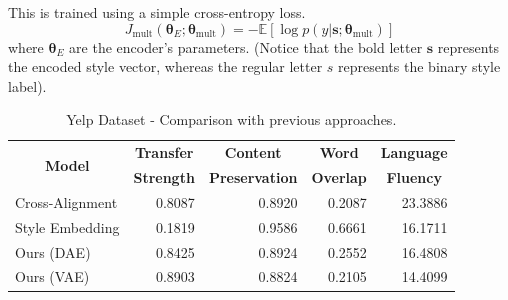 \documentclass[11pt,a4paper]{article}
\newcommand{\tabh}[1]{\multicolumn{1}{c|}{\textbf{#1}}}
\newcommand{\tabc}[2]{\multicolumn{1}{|c|}{\multirow{#1}{*}{\textbf{#2}}}}
\newcommand{\loss}[1]{J_\text{#1}}
\begin{document}
This is trained using a simple cross-entropy loss.
\begin{equation} \label{eqn:multi-task-loss}
	\loss{mult}(\bm\theta_{E};\bm\theta_\text{mult}) =
	- \mathbb{E} [\log p(y | \bm s; \bm\theta_\text{mult})]
\end{equation}
where $\bm\theta_E$ are the encoder's parameters. (Notice that the bold letter $\bm s$ represents the encoded style vector, whereas the regular letter $s$ represents the binary style label).



\begin{table}[ht]
	\centering
	\begin{tabular}{| l | r | r | r | r |}
		\hline
		\tabc{2}{Model}                       & \tabh{Transfer} & \tabh{Content}      & \tabh{Word}    & \tabh{Language} \\
		                                      & \tabh{Strength} & \tabh{Preservation} & \tabh{Overlap} & \tabh{Fluency}  \\
		\hline
		\hline
		Cross-Alignment \citep{shen2017style} & 0.8087          & 0.8920              & 0.2087         & 23.3886         \\
		\hline
		Style Embedding \citep{fu2017style}   & 0.1819          & 0.9586              & 0.6661         & 16.1711         \\
		\hline
		Ours (DAE)                            & 0.8425          & 0.8924              & 0.2552         & 16.4808         \\
		\hline
		Ours (VAE)                            & 0.8903          & 0.8824              & 0.2105         & 14.4099         \\
		\hline
	\end{tabular}
	\caption{Yelp Dataset - Comparison with previous approaches.}
	\label{tab:yelp-comparison-previous}
\end{table}
\end{document}
